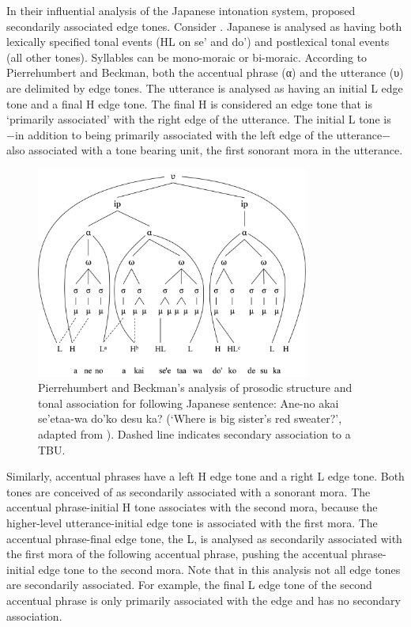 In their influential analysis of the Japanese intonation system, \citet{PierrBeck1988} proposed secondarily associated edge tones. Consider . Japanese is analysed as having both lexically specified tonal events (HL on se’ and do’) and postlexical tonal events (all other tones). Syllables can be mono-moraic or bi-moraic. According to Pierrehumbert and Beckman, both the accentual phrase (α) and the utterance (υ) are delimited by edge tones. The utterance is analysed as having an initial L edge tone and a final H edge tone. The final H is considered an edge tone that is ‘primarily associated’ with the right edge of the utterance. The initial L tone is −in addition to being primarily associated with the left edge of the utterance− also associated with a tone bearing unit, the first sonorant mora in the utterance.  

\begin{figure}
  \centering 
   \includegraphics[width=0.8\textwidth]{figures/Figure_2_6.png}
  \caption{Pierrehumbert and Beckman’s analysis of prosodic structure and tonal association for following Japanese sentence: Ane-no akai se’etaa-wa do’ko desu ka? (‘Where is big sister’s red sweater?’, adapted from \citet[21]{PierrBeck1988}). Dashed line indicates secondary association to a TBU.}
   \label{fig:2.6}
   \end{figure}
   
Similarly, accentual phrases have a left H edge tone and a right L edge tone. Both tones are conceived of as secondarily associated with a sonorant mora. The accentual phrase-initial H tone associates with the second mora, because the higher-level utterance-initial edge tone is associated with the first mora. The accentual phrase-final edge tone, the L, is analysed as secondarily associated with the first mora of the following accentual phrase, pushing the accentual phrase-initial edge tone to the second mora. Note that in this analysis not all edge tones are secondarily associated. For example, the final L edge tone of the second accentual phrase is only primarily associated with the edge and has no secondary association.
 
